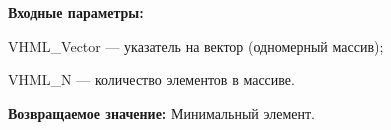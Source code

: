 \textbf{Входные параметры:}

 VHML\_Vector --- указатель на вектор (одномерный массив);
 
 VHML\_N --- количество элементов в массиве.

\textbf{Возвращаемое значение:}
Минимальный элемент.